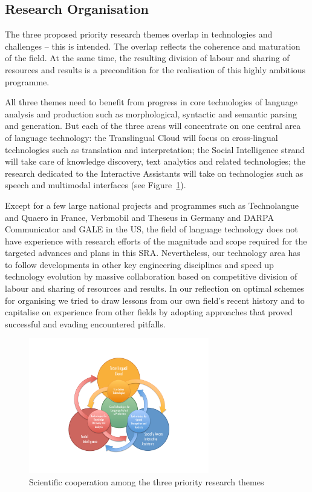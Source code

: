 \documentclass[10pt, plain]{../../metanetpaper}
\begin{document}
\begin{multicols}{2}
\subsection[Structure and Principles of Research Organisation]{Research Organisation}
\label{sec:struct-princ-research-org}

The three proposed priority  research themes overlap in technologies and challenges -- this is intended. The overlap reflects the coherence and maturation of the field. At the same time, the resulting division of labour and sharing of resources and results is a precondition for the realisation of this highly ambitious programme.

All three themes need to benefit from progress in core technologies of language analysis and production such as morphological, syntactic and semantic parsing and generation. But each of the three areas will concentrate on one central area of language technology: the Translingual Cloud will focus on cross-lingual technologies such as translation and interpretation; the Social Intelligence strand will take care of knowledge discovery, text analytics and related technologies; the research dedicated to the Interactive Assistants will take on technologies such as speech and multimodal interfaces (see Figure~\ref{fig:priority-themes}).

Except for a few large national projects and programmes such as Technolangue and Quaero in France, Verbmobil and Theseus in Germany and DARPA Communicator and GALE in the US, the field of language technology does not have experience with research efforts of the magnitude and scope required for the targeted advances and plans in this SRA. Nevertheless, our technology area has to follow developments in other key engineering disciplines and speed up technology evolution by massive collaboration based on competitive division of labour and sharing of resources and results. In our reflection on optimal schemes for organising we tried to draw lessons from our own field's recent history and to capitalise on experience from other fields by adopting approaches that proved successful and evading encountered pitfalls.
 
\begin{figure}[htb]
  \center
  \includegraphics[width=0.70\textwidth]{../_media/PT-Rings.pdf}
  \caption{Scientific cooperation among the three priority research themes}
  \label{fig:priority-themes}
\end{figure}
 

\end{multicols}
\end{document}
